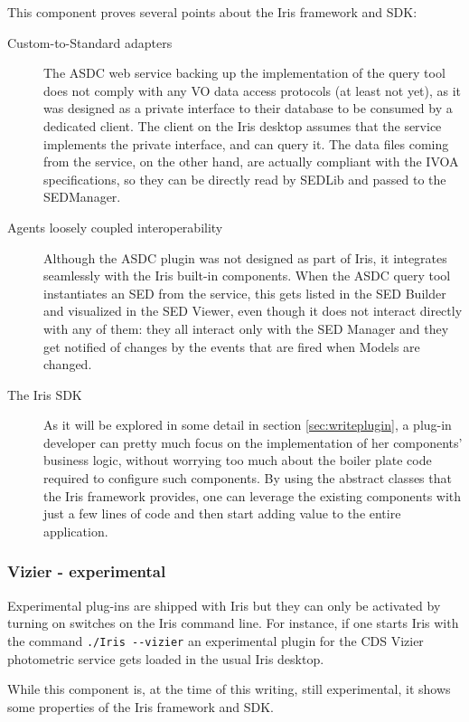 \documentclass[5p]{elsarticle}
\begin{document}
This component proves several points about the Iris framework and SDK:
\begin{description}
\item[Custom-to-Standard adapters] The ASDC web service backing up the implementation of the query tool does not comply with any VO data access protocols (at least not yet), as it was designed as a private interface to their database to be consumed by a dedicated client. The client on the Iris desktop assumes that the service implements the private interface, and can query it. The data files coming from the service, on the other hand, are actually compliant with the IVOA specifications, so they can be directly read by SEDLib and passed to the SEDManager.
\item[Agents loosely coupled interoperability] Although the ASDC plugin was not designed as part of Iris, it integrates seamlessly with the Iris built-in components. When the ASDC query tool instantiates an SED from the service, this gets listed in the SED Builder and visualized in the SED Viewer, even though it does not interact directly with any of them: they all interact only with the SED Manager and they get notified of changes by the events that are fired when Models are changed.
\item[The Iris SDK] As it will be explored in some detail in section \ref{sec:writeplugin}, a plug-in developer can pretty much focus on the implementation of her components' business logic, without worrying too much about the boiler plate code required to configure such components. By using the abstract classes that the Iris framework
provides, one can leverage the existing components with just a few lines of code and then start adding value to the entire application.
\end{description}

\subsubsection{Vizier - experimental}
\label{sec:asdc}
Experimental plug-ins are shipped with Iris but they can only be activated by turning on switches on the Iris command line. For instance, if one starts Iris with the command \verb|./Iris --vizier| an experimental plugin for the CDS Vizier photometric service gets loaded in the usual Iris desktop.

While this component is, at the time of this writing, still experimental, it shows some properties of the Iris framework and SDK.
\end{document}
